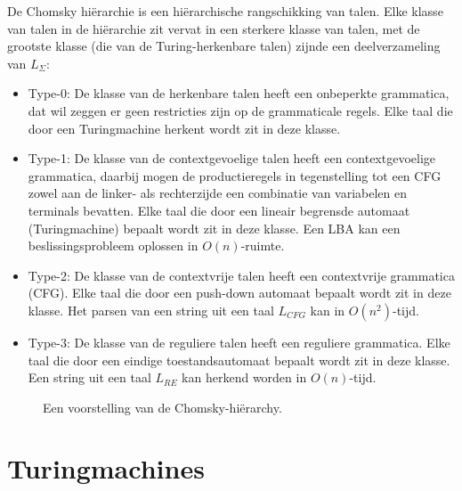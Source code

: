\documentclass[a4paper]{article}
\newcommand{\powerset}{\ensuremath{\mathcal{P}}}
\newcommand{\sstar}{\ensuremath{\Sigma^*}}
\begin{document}
De Chomsky hi\"erarchie is een hi\"erarchische rangschikking van talen. Elke klasse van talen in de hi\"erarchie zit vervat in een sterkere klasse van talen, met de grootste klasse (die van de Turing-herkenbare talen) zijnde een deelverzameling van $L_\Sigma$:
\begin{itemize}
\item Type-0: De klasse van de herkenbare talen heeft een onbeperkte grammatica, dat wil zeggen er geen restricties zijn op de grammaticale regels. Elke taal die door een Turingmachine herkent wordt zit in deze klasse.
\item Type-1: De klasse van de contextgevoelige talen heeft een contextgevoelige grammatica, daarbij mogen de productieregels in tegenstelling tot een CFG zowel aan de linker- als rechterzijde een combinatie van variabelen en terminals bevatten. Elke taal die door een lineair begrensde automaat (Turingmachine) bepaalt wordt zit in deze klasse. Een LBA kan een beslissingsprobleem oplossen in $O(n)$-ruimte.
\item Type-2: De klasse van de contextvrije talen heeft een contextvrije grammatica (CFG). Elke taal die door een push-down automaat bepaalt wordt zit in deze klasse. Het parsen van een string uit een taal $L_{CFG}$ kan in $O(n^2)$-tijd.
\item Type-3: De klasse van de reguliere talen heeft een reguliere grammatica. Elke taal die door een eindige toestandsautomaat bepaalt wordt zit in deze klasse. Een string uit een taal $L_{RE}$ kan herkend worden in $O(n)$-tijd.
\end{itemize}

\begin{figure}[ht]
\centering
  \caption{Een voorstelling van de Chomsky-hi\"erarchy.}
\end{figure}

\newpage\section{Turingmachines}
\end{document}
